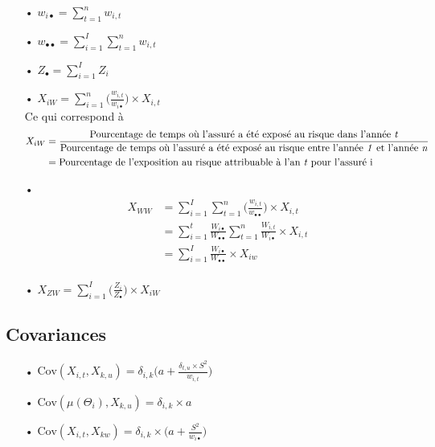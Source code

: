 \documentclass[11pt,french]{report}
\begin{document}
\begin{itemize}
\item[•] $w_{i\bullet} = \sum_{t=1}^{n} w_{i,t}$
\item[•] $w_{\bullet \bullet} = \sum_{i=1}^{I} \sum_{t=1}^{n} w_{i,t}$
\item[•] $Z_{\bullet} = \sum_{i=1}^{I} Z_i$
\item[•] $X_{i W} = \sum_{i=1}^{n} \Bigg( \frac{w_{i,t}}{w_{i\bullet}}  \Bigg) \times X_{i,t}$ 
\\
Ce qui correspond à \\
\begin{align*}
X_{i W}&= \frac{\text{Pourcentage de temps où l'assuré a été exposé au risque dans l'année \textit{t}}}{\text{Pourcentage de temps où l'assuré a été exposé au risque entre l'année \textit{1} et l'année \textit{n}}} \\
&= \text{Pourcentage de l'exposition au risque attribuable à l'an \textit{t} pour l'assuré i}
\end{align*}
\item[•] \begin{align*}
X_{W W} &= \sum_{i = 1}^{I} \sum_{t= 1}^{n} \Bigg( \frac{w_{i,t}}{w_{\bullet \bullet}}\Bigg) \times X_{i,t} \\
&= \sum_{i=1}^{t} \frac{W_{i \bullet}}{W_{\bullet \bullet}} \sum_{t=1}^{n} \frac{W_{i, t}}{W_{i \bullet}} \times X_{i,t} \\
&= \sum_{i=1}^{I} \frac{W_{i \bullet}}{W_{\bullet \bullet}} \times X_{i w} \\
\end{align*} 
\item[•] $X_{Z W} = \sum_{i=1}^{I} \Bigg(\frac{Z_i}{Z_{\bullet}}\Bigg) \times X_{i W}$
\end{itemize}

\subsection*{Covariances}
\begin{itemize}
\item[•] $\text{Cov}(X_{i,t}, X_{k, u}) = \delta_{i,k} \Big(  a + \frac{\delta_{t,u} \times S^2}{w_{i,t}}\Big)$
\item[•] $\text{Cov}(\mu(\Theta_i), X_{k, u}) = \delta_{i,k} \times a $
\item[•] $\text{Cov}(X_{i,t}, X_{k w}) = \delta_{i,k} \times \Big(a + \frac{S^2}{w_{i \bullet}} \Big) $
\end{itemize}
\end{document}

